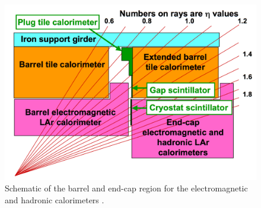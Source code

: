 \documentclass{article}
\begin{document}
\begin{figure}[h]
    \centering
    \includegraphics[scale=0.25]{images/etaDiagram.png}
    \caption{ Schematic of the barrel and end-cap region for the electromagnetic and hadronic calorimeters \cite{ATLASCH10}. \label{fig:etaDiagram} }
\end{figure}


\end{document}
